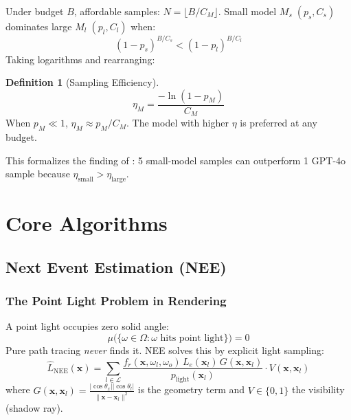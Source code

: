 \documentclass[11pt,twocolumn]{article}
\theoremstyle{definition}
\newtheorem{definition}[theorem]{Definition}
\newcommand{\bx}{\mathbf{x}}
\begin{document}
Under budget $B$, affordable samples: $N = \lfloor B/C_M \rfloor$.
Small model $M_s\;(p_s, C_s)$ dominates large $M_l\;(p_l, C_l)$ when:
\begin{equation}\label{eq:dominance}
  (1-p_s)^{B/C_s} < (1-p_l)^{B/C_l}
\end{equation}
Taking logarithms and rearranging:

\begin{definition}[Sampling Efficiency]\label{def:efficiency}
\begin{equation}\label{eq:eta}
  \boxed{\eta_M = \frac{-\ln(1-p_M)}{C_M}}
\end{equation}
When $p_M \ll 1$, $\eta_M \approx p_M / C_M$.
The model with higher $\eta$ is preferred at any budget.
\end{definition}

This formalizes the finding of \citet{brown2024monkeys}: 5 small-model samples
can outperform 1 GPT-4o sample because $\eta_{\text{small}} > \eta_{\text{large}}$.

\section{Core Algorithms}\label{sec:algorithms}

\subsection{Next Event Estimation (NEE)}\label{sec:nee}

\subsubsection{The Point Light Problem in Rendering}

A point light occupies zero solid angle:
\begin{equation}\label{eq:point-light-measure}
  \mu\bigl(\{\omega \in \Omega : \omega \text{ hits point light}\}\bigr) = 0
\end{equation}
Pure path tracing \emph{never} finds it.
NEE solves this by explicit light sampling:
\begin{equation}\label{eq:nee-rendering}
  \hat{L}_{\text{NEE}}(\bx) = \sum_{l \in \mathcal{L}}
    \frac{f_r(\bx, \omega_l, \omega_o)\,L_e(\bx_l)\,G(\bx, \bx_l)}{p_{\text{light}}(\bx_l)}
    \cdot V(\bx, \bx_l)
\end{equation}
where $G(\bx,\bx_l) = \frac{|\cos\theta_x||\cos\theta_l|}{\|\bx - \bx_l\|^2}$
is the geometry term and $V \in \{0,1\}$ the visibility (shadow ray).
\end{document}
